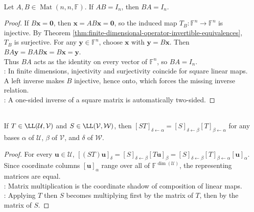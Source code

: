 \begin{theorem} \label{thm:square-one-sided-inverse-is-two-sided} \\
Let $A,B\in\operatorname{Mat}(n,n,\mathbb{F})$. If $AB=I_n$, then $BA=I_n$.
\begin{proof}
If $B\mathbf{x}=\mathbf{0}$, then $\mathbf{x}=AB\mathbf{x}=\mathbf{0}$, so the induced map $T_B:\mathbb{F}^n\to\mathbb{F}^n$ is injective. By Theorem \ref{thm:finite-dimensional-operator-invertible-equivalences}, $T_B$ is surjective. For any $\mathbf{y}\in\mathbb{F}^n$, choose $\mathbf{x}$ with $\mathbf{y}=B\mathbf{x}$. Then $BA\mathbf{y}=BAB\mathbf{x}=B\mathbf{x}=\mathbf{y}$.\\
Thus $BA$ acts as the identity on every vector of $\mathbb{F}^n$, so $BA=I_n$.\\
: In finite dimensions, injectivity and surjectivity coincide for square linear maps. A left inverse makes $B$ injective, hence onto, which forces the missing inverse relation.\\
: A one-sided inverse of a square matrix is automatically two-sided.
\end{proof}
\end{theorem}

\begin{proposition} \label{prop:composition-and-matrix-multiplication} \\
If $T \in \LL(\mathcal{U}, \mathcal{V})$ and $S \in \LL(\mathcal{V}, \mathcal{W})$, then $[ST]_{\delta \leftarrow \alpha} = [S]_{\delta \leftarrow \beta}[T]_{\beta \leftarrow \alpha}$ for any bases $\alpha$ of $\mathcal{U}$, $\beta$ of $\mathcal{V}$, and $\delta$ of $\mathcal{W}$.
\begin{proof}
For every $\mathbf{u}\in\mathcal{U}$, $[(ST)\mathbf{u}]_{\delta}=[S]_{\delta \leftarrow \beta}[T\mathbf{u}]_{\beta}=[S]_{\delta \leftarrow \beta}[T]_{\beta \leftarrow \alpha}[\mathbf{u}]_{\alpha}$.\\
Since coordinate columns $[\mathbf{u}]_{\alpha}$ range over all of $\mathbb{F}^{\dim(\mathcal{U})}$, the representing matrices are equal.\\
: Matrix multiplication is the coordinate shadow of composition of linear maps.\\
: Applying $T$ then $S$ becomes multiplying first by the matrix of $T$, then by the matrix of $S$.
\end{proof}
\end{proposition}

